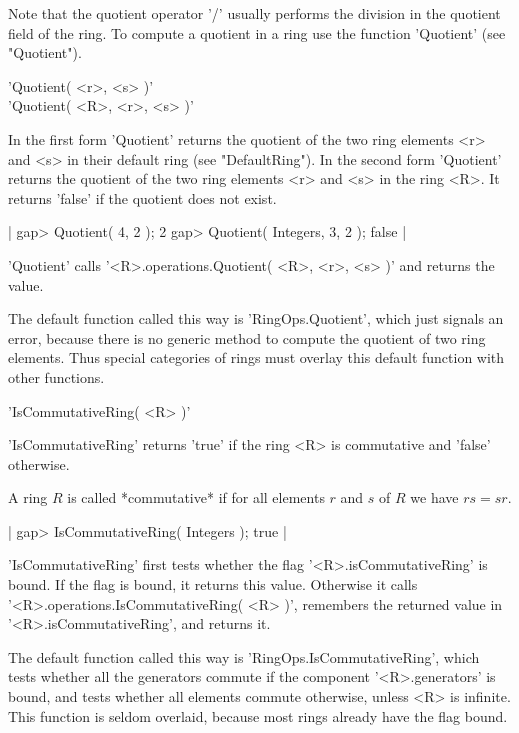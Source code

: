 Note that the quotient operator '/' usually performs  the division in the
quotient  field of the  ring.  To compute a quotient   in  a ring use the
function 'Quotient' (see "Quotient").


'Quotient( <r>, <s> )' \\
'Quotient( <R>, <r>, <s> )'

In  the first  form  'Quotient'  returns  the quotient  of  the  two ring
elements <r> and <s> in  their default ring  (see "DefaultRing").  In the
second form 'Quotient' returns the quotient of the  two ring elements <r>
and  <s> in the  ring <R>.  It  returns 'false' if the quotient  does not
exist.

|    gap> Quotient( 4, 2 );
    2
    gap> Quotient( Integers, 3, 2 );
    false |

'Quotient'  calls '<R>.operations.Quotient( <R>,  <r>, <s> )' and returns
the value.

The default function called  this  way is 'RingOps.Quotient',  which just
signals an error,  because  there is  no generic method  to  compute  the
quotient  of two ring elements.  Thus  special categories of  rings  must
overlay this default function with other functions.


'IsCommutativeRing( <R> )'

'IsCommutativeRing' returns 'true' if   the ring  <R> is  commutative and
'false' otherwise.

A ring $R$ is called *commutative* if for all elements $r$ and $s$ of $R$
we have $r s = s r$.

|    gap> IsCommutativeRing( Integers );
    true |

'IsCommutativeRing'  first tests whether the flag '<R>.isCommutativeRing'
is  bound.  If the flag is bound,  it returns this value.   Otherwise  it
calls '<R>.operations.IsCommutativeRing(  <R> )', remembers  the returned
value in '<R>.isCommutativeRing', and returns it.

The  default  function called  this  way is  'RingOps.IsCommutativeRing',
which  tests  whether  all  the  generators   commute  if  the  component
'<R>.generators'  is  bound,  and  tests  whether  all  elements  commute
otherwise,  unless <R>  is infinite.   This function is seldom  overlaid,
because most rings already have the flag bound.

